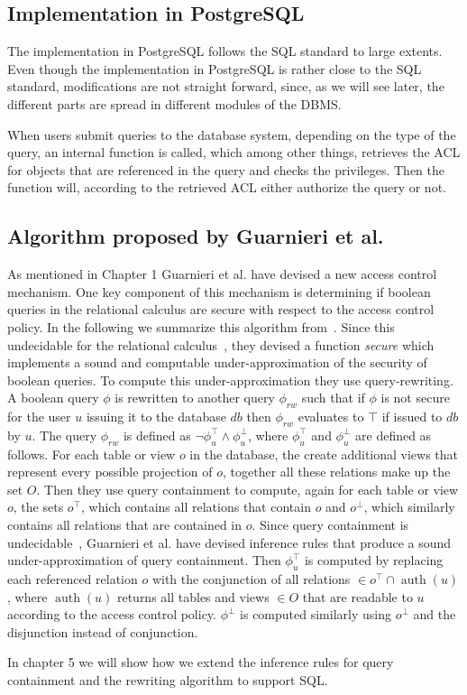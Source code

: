 \subsection{Implementation in PostgreSQL}

The implementation in PostgreSQL follows the SQL standard to large extents. 
%
Even though the implementation in PostgreSQL is rather close to the SQL standard, modifications are not straight forward, since, as we will see later, the different parts are spread in different modules of the DBMS.

When users submit queries to the database system, depending on the type of the query, an internal function is called, which among other things, retrieves the ACL for objects that are referenced in the query and checks the privileges.
%
Then the function will, according to the retrieved ACL either authorize the query or not.

\subsection{Algorithm proposed by Guarnieri et al.}

As mentioned in Chapter 1 Guarnieri et al. have devised a new access control mechanism.
%
One key component of this mechanism is determining if boolean queries in the relational calculus are secure with respect to the access control policy.
%
In the following we summarize this algorithm from~\cite{guarnieri2016strong}.
%
Since this undecidable for the relational calculus~\cite{guarnieri2014optimal}, they devised a function \emph{secure} which implements a sound and computable under-approximation of the security of boolean queries.
%
To compute this under-approximation they use query-rewriting.
%
A boolean query $\phi$ is rewritten to another query $\phi_{rw}$ such that if $\phi$ is not secure for the user $u$ issuing it to the database $db$ then $\phi_{rw}$ evaluates to $\top$ if issued to $db$ by $u$.
%
The query $\phi_{rw}$ is defined as $\lnot \phi^\top_u \land \phi^\bot_u$, where $\phi^\top_u$ and $\phi^\bot_u$ are defined as follows.
%
For each table or view $o$ in the database, the create additional views that represent every possible projection of $o$, together all these relations make up the set $O$.
%
Then they use query containment to compute, again for each table or view $o$, the sets $o^\top$, which contains all relations that contain $o$ and $o^\bot$, which similarly contains all relations that are contained in $o$.
%
Since query containment is undecidable~\cite{abiteboul1995foundations}, Guarnieri et al. have devised inference rules that produce a sound under-approximation of query containment.
%
Then $\phi^\top_u$ is computed by replacing each referenced relation $o$ with the conjunction of all relations $\in o^\top \cap \operatorname{auth}(u)$, where $\operatorname{auth}(u)$ returns all tables and views $\in O$ that are readable to $u$ according to the access control policy.
%
$\phi^\bot$ is computed similarly using $o^\bot$ and the disjunction instead of conjunction.

In chapter 5 we will show how we extend the inference rules for query containment and the rewriting algorithm to support SQL.